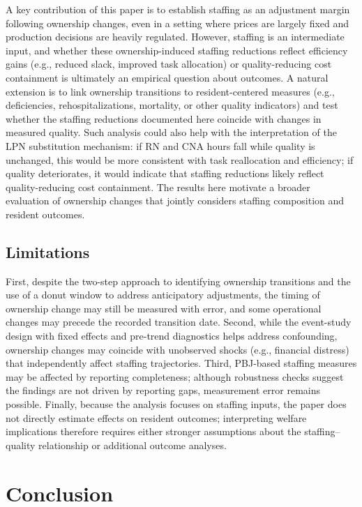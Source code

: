 \documentclass[12pt]{article}
\begin{document}
A key contribution of this paper is to establish staffing as an adjustment margin following ownership changes, even in a setting where prices are largely fixed and production decisions are heavily regulated. However, staffing is an intermediate input, and whether these ownership-induced staffing reductions reflect efficiency gains (e.g., reduced slack, improved task allocation) or quality-reducing cost containment is ultimately an empirical question about outcomes. A natural extension is to link ownership transitions to resident-centered measures (e.g., deficiencies, rehospitalizations, mortality, or other quality indicators) and test whether the staffing reductions documented here coincide with changes in measured quality. Such analysis could also help with the interpretation of the LPN substitution mechanism: if RN and CNA hours fall while quality is unchanged, this would be more consistent with task reallocation and efficiency; if quality deteriorates, it would indicate that staffing reductions likely reflect quality-reducing cost containment. The results here motivate a broader evaluation of ownership changes that jointly considers staffing composition and resident outcomes.

\subsection{Limitations}

First, despite the two-step approach to identifying ownership transitions and the use of a donut window to address anticipatory adjustments, the timing of ownership change may still be measured with error, and some operational changes may precede the recorded transition date. Second, while the event-study design with fixed effects and pre-trend diagnostics helps address confounding, ownership changes may coincide with unobserved shocks (e.g., financial distress) that independently affect staffing trajectories. Third, PBJ-based staffing measures may be affected by reporting completeness; although robustness checks suggest the findings are not driven by reporting gaps, measurement error remains possible. Finally, because the analysis focuses on staffing inputs, the paper does not directly estimate effects on resident outcomes; interpreting welfare implications therefore requires either stronger assumptions about the staffing--quality relationship or additional outcome analyses.

\section{Conclusion} \label{sec:conclusion}
\end{document}

